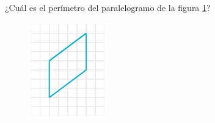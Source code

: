 
\question[25]  ¿Cuál es el perímetro del paralelogramo de la figura \ref{fig:peri_paralelogramo_01}?
\begin{figure}[H]
    \begin{center}
        \includegraphics[width=0.3\textwidth]{../images/peri_paralelogramo_01.png}
    \end{center}
    \caption{}
    \label{fig:peri_paralelogramo_01}
\end{figure}